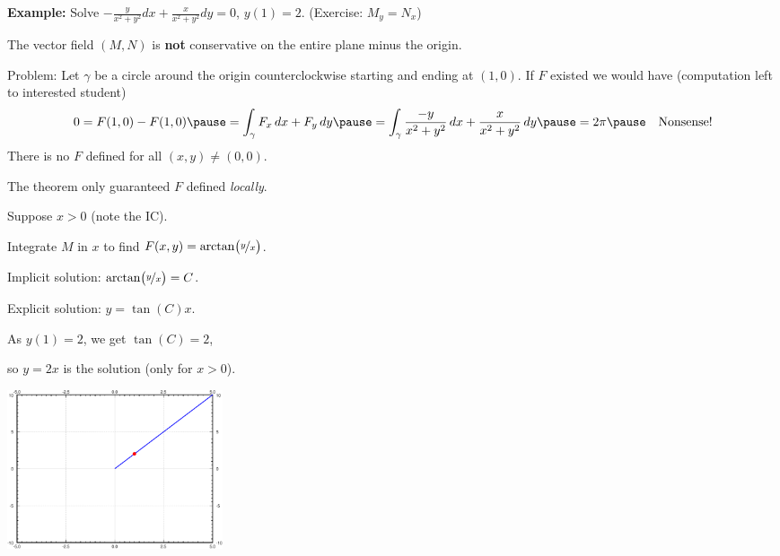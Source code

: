 \documentclass[10pt,aspectratio=169]{beamer}
\begin{document}
\begin{frame}

\textbf{Example:}
Solve
\quad
$\displaystyle
-\frac{y}{x^2+y^2} dx + \frac{x}{x^2+y^2} dy = 0$, \quad $y(1) = 2$.
\qquad
\pause
(Exercise: $M_y = N_x$)

\medskip
\pause

The vector field
$(M,N)$ is \textbf{not} conservative on the entire plane minus the origin.

\pause
Problem: Let $\gamma$ be a circle around the origin counterclockwise
starting and ending at $(1,0)$.
\pause
If $F$ existed we would have
(computation left to interested student)
\[
0 = F(1,0) - F(1,0) \pause = \int_\gamma F_x \, dx + F_y \, dy \pause = \int_\gamma \frac{-y}{x^2+y^2} \, dx +
\frac{x}{x^2+y^2} \, dy \pause = 2\pi 
\pause
\quad
\text{Nonsense!}
\]
\pause
There is no $F$ defined for all $(x,y) \not= (0,0)$.

\medskip
\pause

The theorem only guaranteed $F$ defined \emph{locally}.

\medskip
\pause

Suppose $x > 0$ (note the IC).

\pause
Integrate $M$ in $x$ to find
\quad $F(x,y) = \operatorname{arctan} \bigl( \nicefrac{y}{x} \bigr)$.

\pause
Implicit solution:
\quad
$\operatorname{arctan} \bigl( \nicefrac{y}{x} \bigr) = C$.

\pause
Explicit solution: \quad  $y = \tan(C) x$.

\pause
As $y(1)=2$, we get $\tan(C) = 2$,

so \quad $y=2x$ \quad is the solution (only for $x > 0$).

\vspace*{-1.65in}
\hfill
\includegraphics[width=2.5in]{../figures/exact-y2x}

\end{frame}
\end{document}

